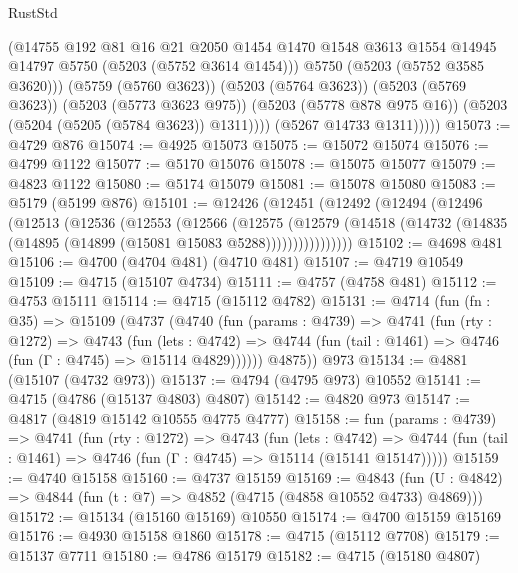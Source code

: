 \begin{lexlean}{RustStd}
\begin{coremodule}
                  (@14755
                    @192
                    @81
                    @16
                    @21
                    @2050
                    @1454
                    @1470
                    @1548
                    @3613
                    @1554
                    @14945
                    @14797
                    @5750
                    (@5203 (@5752 @3614 @1454)))
                  @5750
                  (@5203 (@5752 @3585 @3620)))
                (@5759 (@5760 @3623))
                (@5203 (@5764 @3623))
                (@5203 (@5769 @3623))
                (@5203 (@5773 @3623 @975))
                (@5203 (@5778 @878 @975 @16))
                (@5203 (@5204 (@5205 (@5784 @3623)) @1311))))
            (@5267 @14733 @1311)))))
@15073 := @4729 @876
@15074 := @4925 @15073
@15075 := @15072 @15074
@15076 := @4799 @1122
@15077 := @5170 @15076
@15078 := @15075 @15077
@15079 := @4823 @1122
@15080 := @5174 @15079
@15081 := @15078 @15080
@15083 := @5179 (@5199 @876)
@15101 := @12426
    (@12451
      (@12492
        (@12494
          (@12496
            (@12513
              (@12536
                (@12553
                  (@12566
                    (@12575
                      (@12579
                        (@14518 (@14732 (@14835 (@14895 (@14899 (@15081 @15083 @5288))))))))))))))))
@15102 := @4698 @481
@15106 := @4700 (@4704 @481) (@4710 @481)
@15107 := @4719 @10549
@15109 := @4715 (@15107 @4734)
@15111 := @4757 (@4758 @481)
@15112 := @4753 @15111
@15114 := @4715 (@15112 @4782)
@15131 := @4714
    (fun (fn : @35) =>
    @15109
      (@4737
        (@4740
          (fun (params : @4739) =>
          @4741
            (fun (rty : @1272) =>
            @4743
              (fun (lets : @4742) =>
              @4744 (fun (tail : @1461) => @4746 (fun (Γ : @4745) => @15114 @4829))))))
        @4875))
    @973
@15134 := @4881 (@15107 (@4732 @973))
@15137 := @4794 (@4795 @973) @10552
@15141 := @4715 (@4786 (@15137 @4803) @4807)
@15142 := @4820 @973
@15147 := @4817 (@4819 @15142 @10555 @4775 @4777)
@15158 := fun (params : @4739) =>
  @4741
    (fun (rty : @1272) =>
    @4743
      (fun (lets : @4742) =>
      @4744 (fun (tail : @1461) => @4746 (fun (Γ : @4745) => @15114 (@15141 @15147)))))
@15159 := @4740 @15158
@15160 := @4737 @15159
@15169 := @4843
    (fun (U : @4842) => @4844 (fun (t : @7) => @4852 (@4715 (@4858 @10552 @4733) @4869)))
@15172 := @15134 (@15160 @15169) @10550
@15174 := @4700 @15159 @15169
@15176 := @4930 @15158 @1860
@15178 := @4715 (@15112 @7708)
@15179 := @15137 @7711
@15180 := @4786 @15179
@15182 := @4715 (@15180 @4807)

\end{coremodule}
\end{lexlean}

